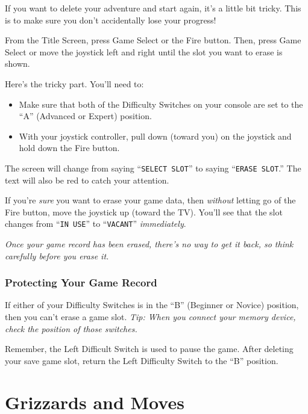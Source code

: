 \documentclass[10pt,twocolumn,openany,article]{memoir}
\begin{document}
\begin{description}
If you want to delete your adventure  and start again, it's a little bit
tricky. This is to make sure you don't accidentally lose your progress!

From the Title Screen, press Game Select or the Fire button. Then, press
Game Select or move the joystick left  and right until the slot you want
to erase is shown.

Here's the tricky part. You'll need to:

\begin{itemize}
\item Make sure that both of the Difficulty Switches on your console
  are set to the ``A'' (Advanced or Expert) position.
\item With your joystick controller, pull down (toward you) on the
  joystick and hold down the Fire button.
\end{itemize}

The screen  will change from  saying ``\texttt{SELECT SLOT}''  to saying
``\texttt{ERASE  SLOT}.''   The  text   will  also   be  red   to  catch
your attention.

If  you're  \emph{sure}   you  want  to  erase  your   game  data,  then
\emph{without}  letting go  of the  Fire  button, move  the joystick  up
(toward  the TV).  You'll see  that the  slot changes  from ``\texttt{IN
  USE}'' to ``\texttt{VACANT}'' \emph{immediately}.

\emph{Once your  game record has been  erased, there's no way  to get it
  back, so think carefully before you erase it.}

\subsection{Protecting Your Game Record}

If  either of  your Difficulty  Switches is  in the  ``B'' (Beginner  or
Novice) position, then you can't erase  a game slot. \emph{Tip: When you
  connect your memory device, check the position of those switches.}

\ifdefined\TVSECAM
Remember,  the  Left  Difficult  Switch  is  used  to  pause  the  game.
After deleting your save game slot, return the Left Difficulty Switch to
the ``B'' position.
\fi

\clearpage

\chapter{Grizzards and Moves}


\end{description}
\end{document}
